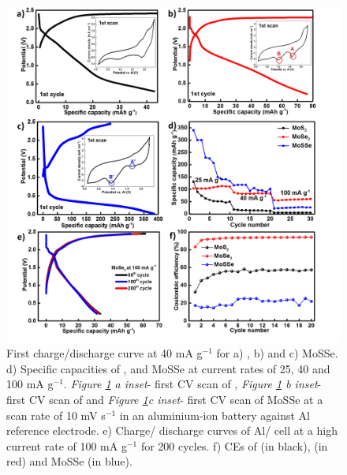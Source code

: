 \begin{figure}[htb!]
\centering
\includegraphics[width=\textwidth]{Figures/chap4fig/MoX2CDCCV}
\caption{First charge/discharge curve at 40 mA g$^{-1}$ for a) , b)  and c) MoSSe. d) Specific capacities of ,  and MoSSe at current rates of 25, 40 and 100 mA g$^{-1}$. \textit{Figure \ref{Figures/chap4fig:MoX2CDCCV} a inset}- first CV scan of , \textit{Figure \ref{Figures/chap4fig:MoX2CDCCV} b inset}- first CV scan of  and \textit{Figure \ref{Figures/chap4fig:MoX2CDCCV}c inset}- first CV scan of MoSSe at a scan rate of 10 mV s$^{-1}$ in an aluminium-ion battery against Al reference electrode. e) Charge/ discharge curves of Al/ cell at a high current rate of 100 mA g$^{-1}$ for 200 cycles. f) CEs of  (in black),  (in red) and MoSSe (in blue).}
\label{Figures/chap4fig:MoX2CDCCV}
\end{figure} 

